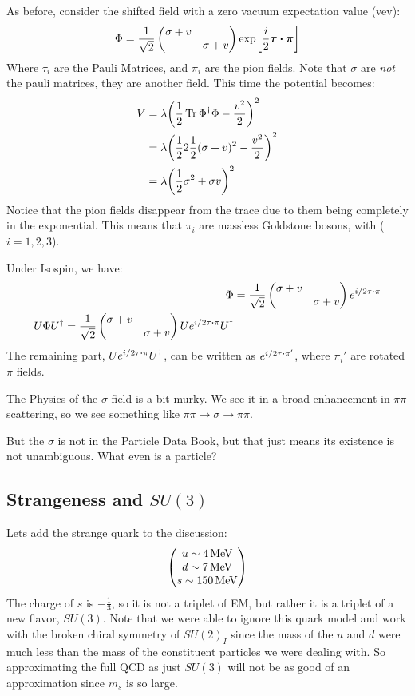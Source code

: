 As before, consider the shifted field with a zero vacuum expectation value (vev):
\begin{align*}
  \Phi=\frac1{\sqrt{2}}\pmqty{\sigma+v\\&\sigma+v}
  \exp[\frac{i}2\bm{\tau}\vdot\bm{\pi}]
\end{align*}
Where $\tau_i$ are the Pauli Matrices, and $\pi_i$ are the pion fields. Note that $\sigma$ are \emph{not} the pauli matrices, they are another field. This time the potential becomes:
\begin{align*}
  V&=\lambda\qty(\frac12\Tr\Phi^\dag\Phi-\frac{v^2}2)^2\\
  &=\lambda\qty(\frac122\frac12(\sigma+v)^2-\frac{v^2}2)^2\\
  &=\lambda\qty(\frac12\sigma^2+\sigma v)^2
\end{align*}
Notice that the pion fields disappear from the trace due to them being completely in the exponential. This means that $\pi_i$ are massless Goldstone bosons, with ($i=1,2,3$).

Under Isospin, we have:
\begin{align*}
  \Phi&=\frac1{\sqrt{2}}\pmqty{\sigma+v\\&\sigma+v}e^{i/2 \tau\vdot\pi}\\
  U\Phi U^\dag=\frac1{\sqrt{2}}\pmqty{\sigma+v\\&\sigma+v}
  Ue^{i/2\tau\vdot\pi}U^\dag
\end{align*}
The remaining part, $Ue^{i/2\tau\vdot\pi}U^\dag$, can be written as $e^{i/2\tau\vdot\pi'}$, where $\pi_i'$ are rotated $\pi$ fields.

The Physics of the $\sigma$ field is a bit murky. We see it in a broad enhancement in $\pi\pi$ scattering, so we see something like $\pi\pi\to\sigma\to\pi\pi$.

But the $\sigma$ is not in the Particle Data Book, but that just means its existence is not unambiguous. What even is a particle?

\subsection{Strangeness and $SU(3)$}
Lets add the strange quark to the discussion:
\begin{align*}
  \pmqty{u\sim\SI{4}{\MeV}\\d\sim\SI{7}{\MeV}\\s\sim\SI{150}{\MeV}\\}
\end{align*}
The charge of $s$ is $-\frac{1}{3}$, so it is not a triplet of EM, but rather it is a triplet of a new flavor, $SU(3)$. Note that we were able to ignore this quark model and work with the broken chiral symmetry of $SU(2)_I$ since the mass of the $u$ and $d$ were much less than the mass of the constituent particles we were dealing with. So approximating the full QCD as just $SU(3)$ will not be as good of an approximation since $m_s$ is so large. 

